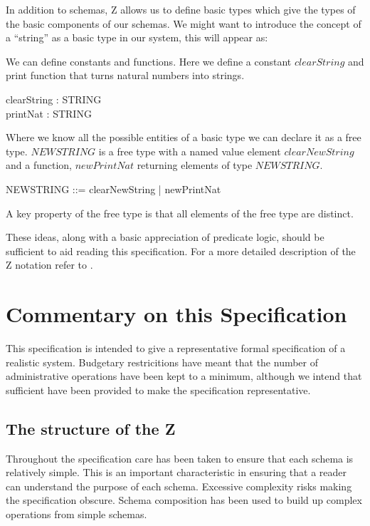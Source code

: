 In addition to schemas, Z allows us to define basic types which give
the types of the basic components of our schemas. We might want to
introduce the concept of a ``string'' as a basic type in our system,
this will appear as:

\begin{zed}
        [ STRING ]
\end{zed}

We can define constants and functions. Here we define a constant
$clearString$ and print function that
turns natural numbers into strings.

\begin{axdef}
        clearString : STRING
\\      printNat : \nat \inj STRING
\end{axdef}

Where we know all the possible entities of a basic type we can
declare it as a free type. $NEWSTRING$ is a free type with a named
value element $clearNewString$ and a function, $newPrintNat$ returning 
elements of type $NEWSTRING$.

\begin{zed}
        NEWSTRING ::= clearNewString | newPrintNat \ldata \nat \rdata
\end{zed} 
A key property of the free type is that all elements of the free type
are distinct.

These ideas, along with a basic appreciation of predicate logic, should be sufficient to aid reading this
specification. For a more detailed description of the Z notation refer
to \cite{Spivey}.

\chapter{Commentary on this Specification}
\label{sec:Summary}

This specification is intended to give a representative formal
specification of a realistic system. Budgetary restricitions have
meant that the number of administrative operations have been kept to a
minimum, although we intend that sufficient have been provided to make
the specification representative.

\section{The structure of the Z}
Throughout the specification care has been taken to ensure that each
schema is relatively simple. This is an important characteristic in
ensuring that a reader can understand the purpose of each
schema. Excessive complexity risks making the specification obscure. 
Schema composition has been used to build up complex
operations from simple schemas.

